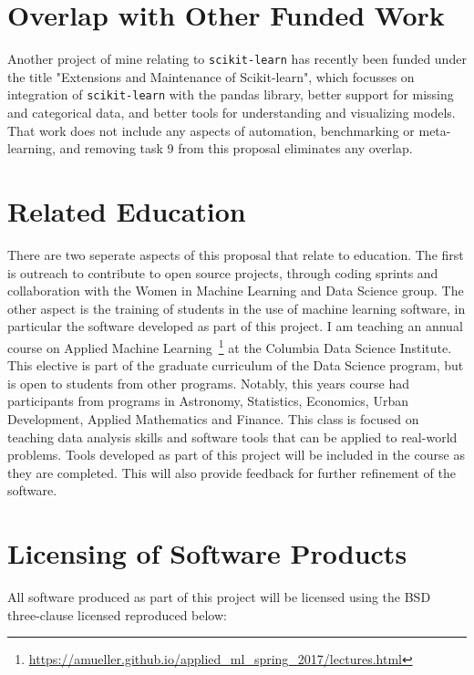 \documentclass[11pt,letterpaper]{article}
\newcommand{\sklearn}[0]{\texttt{scikit-learn}\xspace}                    %
\begin{document}
\section{Overlap with Other Funded Work}
Another project of mine relating to \sklearn has recently been funded under the title
"Extensions and Maintenance of Scikit-learn", which focusses on integration of \sklearn
with the pandas library, better support for missing and categorical data,
and better tools for understanding and visualizing models. That work does not include
any aspects of automation, benchmarking or meta-learning, and removing task 9 from
this proposal eliminates any overlap.

\section{Related Education}
There are two seperate aspects of this proposal that relate to education. The first is outreach
to contribute to open source projects, through coding sprints and collaboration
with the Women in Machine Learning and Data Science group.
The other aspect is the training of students in the use of machine learning software,
in particular the software developed as part of this project.
I am teaching an annual course on Applied Machine
Learning~\footnote{\url{https://amueller.github.io/applied_ml_spring_2017/lectures.html}}
at the Columbia Data Science Institute. This elective is part of the graduate
curriculum of the Data Science program, but is open to students from other programs.
Notably, this years course had participants from programs in Astronomy, Statistics,
Economics, Urban Development, Applied Mathematics and Finance.
This class is focused on teaching data analysis skills and software tools that
can be applied to real-world problems. Tools developed as part of this project
will be included in the course as they are completed. This will also provide
feedback for further refinement of the software.

\section{Licensing of Software Products}
All software produced as part of this project will be licensed using the BSD three-clause
licensed reproduced below:
\end{document}
